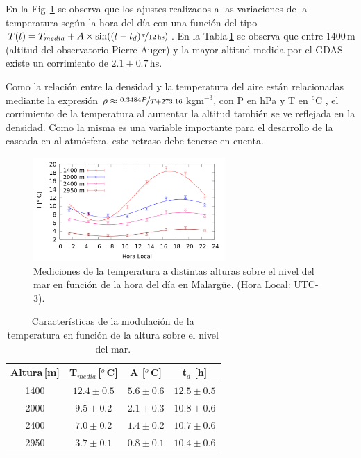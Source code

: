 En la Fig.\,\ref{fig:delay} se observa que los ajustes realizados a las variaciones de la temperatura  según la hora del día con una función del tipo $T(t) = T_{media} + A\times \sin((t-t_d)\nicefrac{\pi}{12\,\text{hs}})$.  En la Tabla\,\ref{tabla:delay} se observa que entre 1400\,m (altitud del observatorio Pierre Auger) y la mayor altitud medida por el GDAS existe un corrimiento de $2.1\pm0.7\,$hs.

Como la relación entre la densidad y la temperatura del aire están relacionadas mediante la expresión $\rho \approx \nicefrac{0.3484P}{T +273.16}\,$kgm$^{-3}$, con P en hPa y T en  $^o$C \cite{aab2017impact}, el corrimiento de la temperatura al aumentar la altitud también se ve reflejada en la densidad. Como la misma es una variable importante para el desarrollo de la cascada en al atmósfera, este retraso debe tenerse en cuenta.

\begin{figure}[H]
	\centering
	\includegraphics[width=0.65\textwidth]{delay.png}
	\caption{Mediciones de la temperatura a distintas alturas sobre el nivel del mar en función de la hora del día en Malargüe. (Hora Local: UTC-3).}
	\label{fig:delay}
\end{figure}
\begin{table}[H]
\centering
\begin{tabular}{|c|c|c|c|}
\hline
Altura\,[m] & 	T$_{media}$\,[$^o$\,C] 	& A [$^o$\,C] 	& t$_d$ [h] 	\\ \hline
1400		& 	$12.4\pm0.5$			& $5.6\pm0.6$ 	& $12.5\pm0.5$ 		\\ \hline
2000		& 	$9.5\pm0.2$				& $2.1\pm0.3$ 	& $10.8\pm0.6$ 		\\ \hline
2400		&  	$7.0\pm0.2$				& $1.4\pm0.2$	& $10.7\pm0.6$ 		\\ \hline
2950		& 	$3.7\pm0.1$				& $0.8\pm0.1$	& $10.4\pm0.6$ 		\\ \hline
\end{tabular}
\caption{Características de la modulación de la temperatura en función de la altura sobre el nivel del mar.}\label{tabla:delay}
\end{table}


